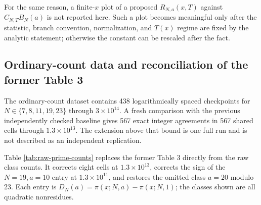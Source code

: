 \documentclass[12pt,reqno]{amsart}
\theoremstyle{definition}
\theoremstyle{remark}
\numberwithin{equation}{section}
\begin{document}
For the same reason, a finite-$x$ plot of a proposed
$R_{N,a}(x,T)$ against $C_{N,T}B_N(a)$ is not reported here.  Such a plot becomes
meaningful only after the statistic, branch convention, normalization, and
$T(x)$ regime are fixed by the analytic statement; otherwise the constant can
be rescaled after the fact.

\subsection{Ordinary-count data and reconciliation of the former Table 3}

The ordinary-count dataset contains 438 logarithmically spaced checkpoints for
$N\in\{7,8,11,19,23\}$ through $3\times10^{14}$.  A fresh comparison with the
previous independently checked baseline gives 567 exact integer agreements in
567 shared cells through $1.3\times10^{13}$.  The extension above that bound is
one full run and is not described as an independent replication.

Table \ref{tab:raw-prime-counts} replaces the former Table 3 directly from the
raw class counts.  It corrects eight cells at $1.3\times10^{13}$, corrects the
sign of the $N=19,a=10$ entry at $1.3\times10^{11}$, and restores the omitted
class $a=20$ modulo 23.  Each entry is
$D_N(a)=\pi(x;N,a)-\pi(x;N,1)$; the classes shown are all quadratic
nonresidues.
\end{document}
